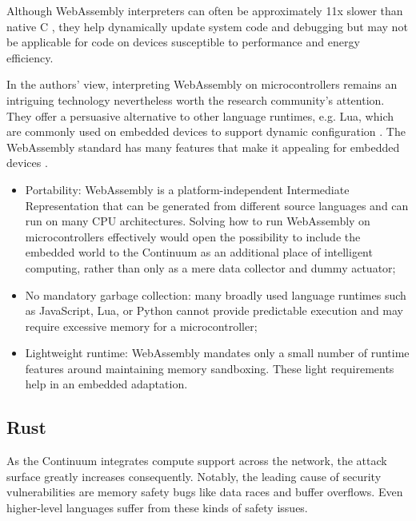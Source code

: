Although WebAssembly interpreters can often be approximately 11x slower than native C \cite{wasm3-performance}, they help dynamically update system code and debugging but may not be applicable for code on devices susceptible to performance and energy efficiency.

In the authors' view, interpreting WebAssembly on microcontrollers remains an intriguing technology nevertheless worth the research community's attention. They offer a persuasive alternative to other language runtimes, e.g. Lua, which are commonly used on embedded devices to support dynamic configuration \cite{brzoza2016embedded}. The WebAssembly standard has many features that make it appealing for embedded devices \cite{peach2020ewasm}.

\begin{itemize}
    \item Portability: WebAssembly is a platform-independent Intermediate Representation that can be generated from different source languages and can run on many CPU architectures. Solving how to run WebAssembly on microcontrollers effectively would open the possibility to include the embedded world to the Continuum as an additional place of intelligent computing, rather than only as a mere data collector and dummy actuator;
    \item No mandatory garbage collection: many broadly used language runtimes such as JavaScript, Lua, or Python cannot provide predictable execution and may require excessive memory for a microcontroller;
    \item Lightweight runtime: WebAssembly mandates only a small number of runtime features around maintaining memory sandboxing. These light requirements help in an embedded adaptation.
\end{itemize}

\subsection{Rust}
\label{sec:rust}

As the Continuum integrates compute support across the network, the attack surface greatly increases consequently. Notably, the leading cause of security vulnerabilities are memory safety bugs like data races and buffer overflows. Even higher-level languages suffer from these kinds of safety issues.

